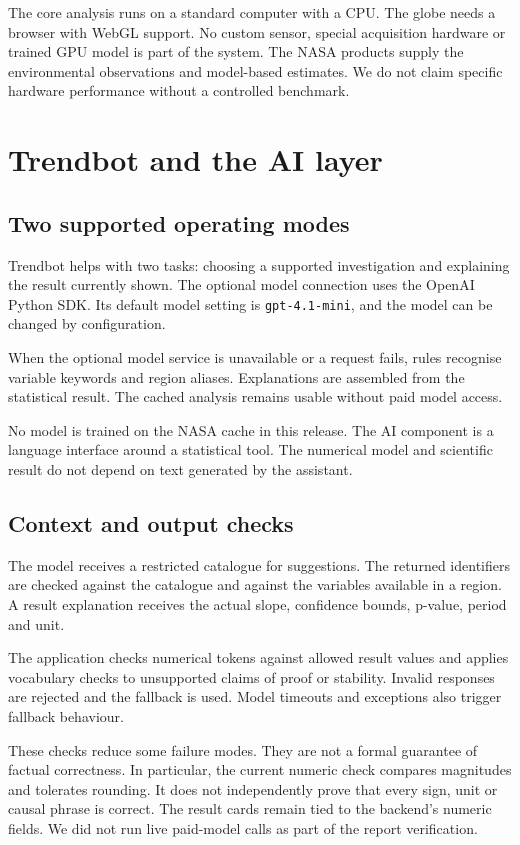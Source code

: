 \documentclass[10pt,a4paper,twocolumn]{article}
\newcommand{\code}[1]{\texttt{#1}}
\begin{document}
The core analysis runs on a standard computer with a CPU. The globe needs a browser with WebGL support. No custom sensor, special acquisition hardware or trained GPU model is part of the system. The NASA products supply the environmental observations and model-based estimates. We do not claim specific hardware performance without a controlled benchmark.

\section{Trendbot and the AI layer}
\subsection{Two supported operating modes}
Trendbot helps with two tasks: choosing a supported investigation and explaining the result currently shown. The optional model connection uses the OpenAI Python SDK. Its default model setting is \code{gpt-4.1-mini}, and the model can be changed by configuration.

When the optional model service is unavailable or a request fails, rules recognise variable keywords and region aliases. Explanations are assembled from the statistical result. The cached analysis remains usable without paid model access.

No model is trained on the NASA cache in this release. The AI component is a language interface around a statistical tool. The numerical model and scientific result do not depend on text generated by the assistant.

\subsection{Context and output checks}
The model receives a restricted catalogue for suggestions. The returned identifiers are checked against the catalogue and against the variables available in a region. A result explanation receives the actual slope, confidence bounds, p-value, period and unit.

The application checks numerical tokens against allowed result values and applies vocabulary checks to unsupported claims of proof or stability. Invalid responses are rejected and the fallback is used. Model timeouts and exceptions also trigger fallback behaviour.

These checks reduce some failure modes. They are not a formal guarantee of factual correctness. In particular, the current numeric check compares magnitudes and tolerates rounding. It does not independently prove that every sign, unit or causal phrase is correct. The result cards remain tied to the backend's numeric fields. We did not run live paid-model calls as part of the report verification.
\end{document}
